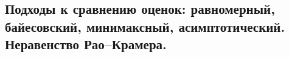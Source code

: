 \subsection{Подходы к сравнению оценок: равномерный, байесовский, минимаксный, асимптотический. Неравенство Рао–Крамера.}

